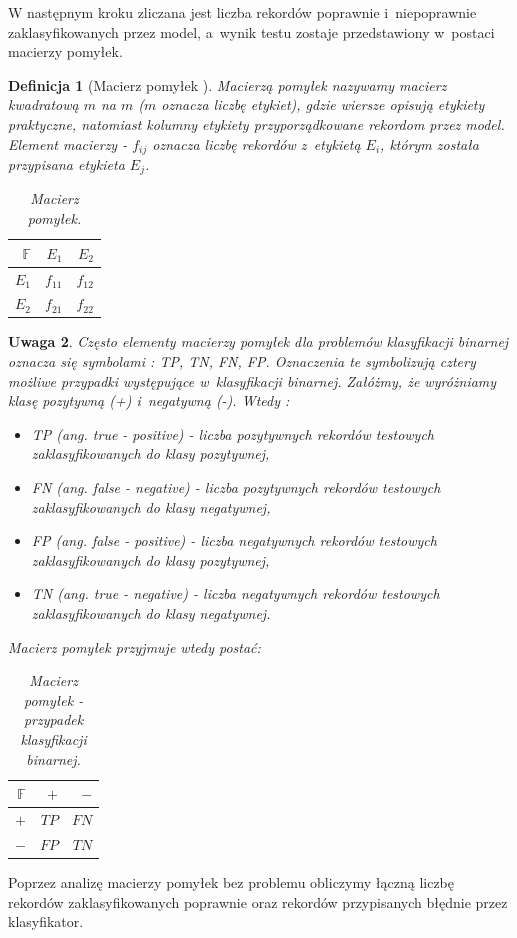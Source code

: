 \documentclass[12pt,a4paper]{report}
\newtheorem{df}{Definicja}[chapter]
\newtheorem{uwaga}[df]{Uwaga}
\begin{document}
W następnym kroku zliczana jest liczba rekordów poprawnie i~niepoprawnie zaklasyfikowanych przez model, a~wynik testu zostaje przedstawiony w~postaci macierzy pomyłek.
\begin{df}[Macierz pomyłek {\citep[Sec 4.8.1]{edmia}}]
Macierzą pomyłek nazywamy macierz kwadratową $m$ na $m$ ($m$ oznacza liczbę etykiet), gdzie wiersze opisują etykiety praktyczne, natomiast kolumny etykiety przyporządkowane rekordom przez model. Element macierzy - $f_{ij}$ oznacza liczbę rekordów z~etykietą $E_i$, którym została przypisana etykieta $E_j$.
\begin{table}[H]
\begin{center}
\begin{tabular}{|r|r|r|} \hline
$\mathbb{F}$ & $E_1$ & $E_2$\\
\hline 
$E_1$ & $f_{11}$ & $f_{12}$ \\
\hline
$E_2$ & $f_{21}$ & $f_{22}$  \\
\hline
\end{tabular}
\end{center}
\caption{Macierz pomyłek.}
\label{tabelka}
\end{table}
\end{df}
\begin{uwaga}{\citep[Sec 4.8.1]{edmia}}
Często elementy macierzy pomyłek dla problemów klasyfikacji binarnej oznacza się symbolami : TP, TN, FN, FP. Oznaczenia te symbolizują cztery możliwe przypadki występujące w~klasyfikacji binarnej. Załóżmy, że wyróżniamy klasę pozytywną (+) i~negatywną (-). Wtedy :
\begin{itemize}
\item TP (ang. true - positive) - liczba pozytywnych rekordów testowych zaklasyfikowanych do klasy pozytywnej,
\item FN (ang. false - negative) - liczba pozytywnych rekordów testowych zaklasyfikowanych do klasy negatywnej,
\item FP (ang. false - positive) - liczba negatywnych rekordów testowych zaklasyfikowanych do klasy pozytywnej,
\item TN (ang. true - negative) - liczba negatywnych rekordów testowych zaklasyfikowanych do klasy negatywnej.
\end{itemize}
Macierz pomyłek przyjmuje wtedy postać:
\begin{table}[H]
\begin{center}
\begin{tabular}{|r|r|r|} \hline
$\mathbb{F}$ & $+$ & $-$\\
\hline
$+$ & $TP$ & $FN$ \\
\hline
$-$ & $FP$ & $TN$  \\
\hline
\end{tabular}
\end{center}
\caption{Macierz pomyłek - przypadek klasyfikacji binarnej.}
\label{tabelka}
\end{table}
\end{uwaga}
Poprzez analizę macierzy pomyłek bez problemu obliczymy łączną liczbę rekordów zaklasyfikowanych poprawnie oraz rekordów przypisanych błędnie przez klasyfikator. 
\end{document}
